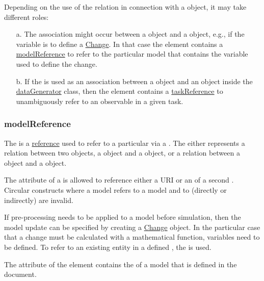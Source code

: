 Depending on the use of the  relation in connection with a \Variable object, it may take different roles: 

\begin{enumerate}
\item[a.]{The  association might occur between a \Variable object and a \Model object, e.g., if the variable is to define a \hyperref[class:change]{Change}. 
In that case the  element contains a \hyperref[sec:modelReference]{modelReference} to refer to the particular model that contains the variable used to define the change.}

\item[b.]{If the  is used as an association between a \Variable object and an \AbstractTask object inside the \hyperref[class:dataGenerator]{dataGenerator} class, then the  element contains a \hyperref[sec:taskReference]{taskReference} to unambiguously refer to an observable in a given task.}
\end{enumerate}


\subsubsection{modelReference}
\label{sec:modelReference}
The  is a \hyperref[sec:reference]{reference} used to refer to a particular \Model via a \SIdRef. The  either represents a relation between two \Model objects, a \Variable object and a \Model object, or a relation between a \Task object and a \Model object.

The \hyperref[sec:model_source]{} attribute of a \Model is allowed to reference either a URI or an \SId of a second \Model. Circular constructs where a model  refers to a model  and  to  (directly or indirectly) are invalid.

If pre-processing needs to be applied to a model before simulation, then the model update can be specified by creating a \hyperref[class:change]{Change} object. In the particular case that a change must be calculated with a mathematical function, variables need to be defined. To refer to an existing entity in a defined \Model, the  is used. 

The  attribute of the  element contains the  of a model that is defined in the document. 

